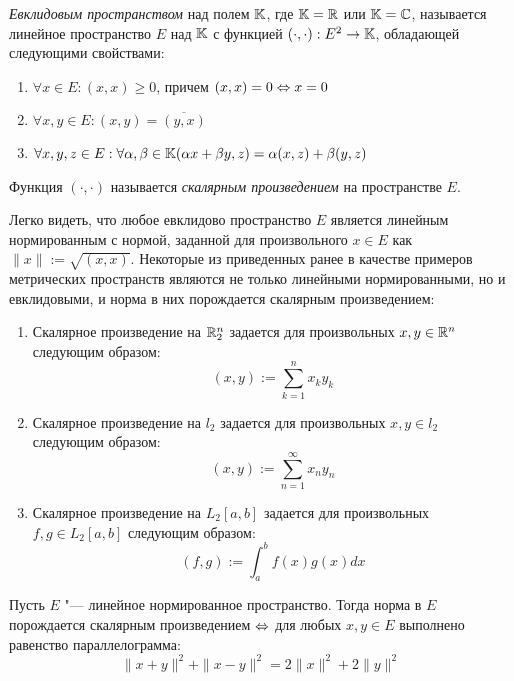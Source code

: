 \begin{definition}
	\textit{Евклидовым пространством} над полем $\mathbb{K}$, где $\mathbb{K} = \mathbb{R}$ или $\mathbb{K} = \mathbb{C}$, называется линейное пространство $E$ над $\mathbb{K}$ с функцией $(\cdot, \cdot) : E^2 \to \mathbb{K}$, обладающей следующими свойствами:
	\begin{enumerate}
		\item $\forall x \in E: (x, x) \ge 0$, причем $(x, x) = 0 \Leftrightarrow x = 0$
		\item $\forall x, y \in E: (x, y) = \overline{(y, x)}$
		\item $\forall x, y, z \in E: \forall \alpha, \beta \in \mathbb{K} (\alpha x + \beta y, z) = \alpha(x, z) + \beta(y, z)$
	\end{enumerate}

	Функция $(\cdot, \cdot)$ называется \textit{скалярным произведением} на пространстве $E$.
\end{definition}

\begin{example}
	Легко видеть, что любое евклидово пространство $E$ является линейным нормированным с нормой, заданной для произвольного $x \in E$ как $\|x\| := \sqrt{(x, x)}$. Некоторые из приведенных ранее в качестве примеров метрических пространств являются не только линейными нормированными, но и евклидовыми, и норма в них порождается скалярным произведением:
	\begin{enumerate}
		\item Скалярное произведение на $\mathbb{R}^n_2$ задается для произвольных $x, y \in \mathbb{R}^n$ следующим образом:
  		\[(x, y) := \sum_{k = 1}^n x_ky_k\]

		\item Скалярное произведение на $l_2$ задается для произвольных $x, y \in l_2$ следующим образом:
		\[(x, y) := \sum_{n = 1}^\infty x_ny_n\]

		\item Скалярное произведение на $L_2[a, b]$ задается для произвольных $f, g \in L_2[a, b]$ следующим образом:
		\[(f, g) := \int_a^b f(x)g(x)dx\]
	\end{enumerate}
\end{example}

\begin{theorem}
	Пусть $E$ "--- линейное нормированное пространство. Тогда норма в $E$ порождается скалярным произведением $\Leftrightarrow$ для любых $x, y \in E$ выполнено равенство параллелограмма:
	\[\|x+y\|^2 + \|x-y\|^2 = 2\|x\|^2 + 2\|y\|^2\]
\end{theorem}

